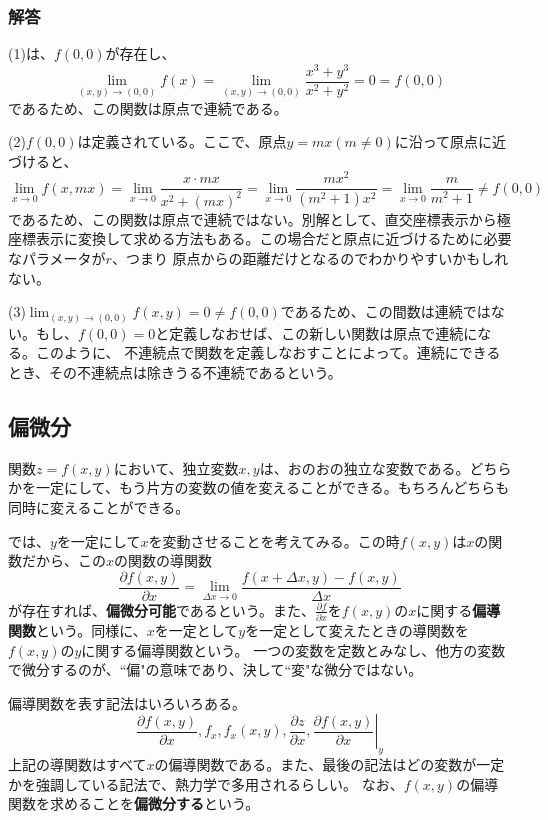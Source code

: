 \documentclass[a4j,dvipdfmx]{jsarticle}
\begin{document}
\subsubsection*{解答}
(1)は、$f(0,0)$が存在し、
\begin{equation*}
    \lim_{(x,y)\to(0,0)}f(x)=\lim_{(x,y)\to(0,0)}\frac{x^3+y^3}{x^2+y^2}=0=f(0,0)
\end{equation*}
であるため、この関数は原点で連続である。

(2)$f(0,0)$は定義されている。ここで、原点$y=mx(m\neq 0)$に沿って原点に近づけると、
\begin{equation*}
    \lim_{x\to 0}f(x,mx)=\lim_{x\to 0}\frac{x\cdot mx}{x^2+(mx)^2}=
    \lim_{x\to 0}\frac{mx^2}{(m^2+1)x^2}=\lim_{x\to 0}\frac{m}{m^2+1}\neq f(0,0)
\end{equation*}
であるため、この関数は原点で連続ではない。別解として、直交座標表示から極座標表示に変換して求める方法もある。この場合だと原点に近づけるために必要なパラメータが$r$、つまり
原点からの距離だけとなるのでわかりやすいかもしれない。

(3)$\displaystyle\lim_{(x,y)\to(0,0)}f(x,y)=0\neq f(0,0)$であるため、この間数は連続ではない。もし、$f(0,0)=0$と定義しなおせば、この新しい関数は原点で連続になる。このように、
不連続点で関数を定義しなおすことによって。連続にできるとき、その不連続点は除きうる不連続であるという。
\subsection{偏微分}
関数$z=f(x,y)$において、独立変数$x,y$は、おのおの独立な変数である。どちらかを一定にして、もう片方の変数の値を変えることができる。もちろんどちらも同時に変えることができる。

では、$y$を一定にして$x$を変動させることを考えてみる。この時$f(x,y)$は$x$の関数だから、この$x$の関数の導関数
\begin{equation}
    \frac{\partial f(x,y) }{\partial x}=\lim_{\Delta x\to 0}\frac{f(x+\Delta x,y)-f(x,y)}{\Delta x}
\end{equation}
が存在すれば、\textbf{偏微分可能}であるという。また、$\displaystyle\frac{\partial f}{\partial x}$を$f(x,y)$の$x$に関する\textbf{偏導関数}という。同様に、$x$を一定として$y$を一定として変えたときの導関数を$f(x,y)$の$y$に関する偏導関数という。
一つの変数を定数とみなし、他方の変数で微分するのが、``偏"の意味であり、決して``変"な微分ではない。

偏導関数を表す記法はいろいろある。
\begin{equation*}
    \frac{\partial f(x,y)}{\partial x},f_x,f_x(x,y),\frac{\partial z}{\partial x},\left. \frac{\partial f(x,y)}{\partial x}\right|_y
\end{equation*}
上記の導関数はすべて$x$の偏導関数である。また、最後の記法はどの変数が一定かを強調している記法で、熱力学で多用されるらしい。
なお、$f(x,y)$の偏導関数を求めることを\textbf{偏微分する}という。
\end{document}
